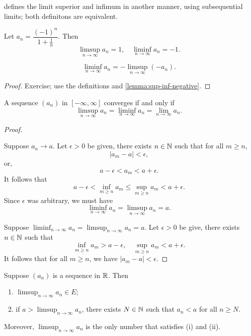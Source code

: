 \begin{remark}
\cite{rudin} defines the limit superior and infimum in another manner, using subsequential limits; both definitons are equivalent.
\end{remark}

\begin{example}
Let $a_n=\dfrac{(-1)^n}{1+\frac{1}{n}}$. Then
\[\limsup_{n\to\infty}a_n=1,\quad\liminf_{n\to\infty}a_n=-1.\]
\end{example}

\begin{lemma}
\[\liminf_{n\to\infty}a_n=-\limsup_{n\to\infty}(-a_n).\]
\end{lemma}

\begin{proof}
Exercise; use the definitions and \ref{lemma:sup-inf-negative}.
\end{proof}

\begin{lemma}
A sequence $(a_n)$ in $[-\infty,\infty]$ converges if and only if
\[\limsup_{n\to\infty}a_n=\liminf_{n\to\infty}a_n=\lim_{n\to\infty}a_n.\]
\end{lemma}

\begin{proof} \

\fbox{$\implies$} Suppose $a_n\to a$. Let $\epsilon>0$ be given, there exists $n\in\mathbb N$ such that for all $m\ge n$,
\[|a_m-a|<\epsilon,\]
or,
\[a-\epsilon<a_m<a+\epsilon.\]
It follows that
\[a-\epsilon<\inf_{m\ge n}a_m\le\sup_{m\ge n}a_m<a+\epsilon.\]
Since $\epsilon$ was arbitrary, we must have
\[\liminf_{n\to\infty}a_n=\limsup_{n\to\infty}a_n=a.\]

\fbox{$\impliedby$} Suppose $\displaystyle\liminf_{n\to\infty}a_n=\limsup_{n\to\infty}a_n=a$. Let $\epsilon>0$ be give, there exists $n\in\mathbb N$ such that
\[\inf_{m\ge n}a_m>a-\epsilon,\quad\sup_{m\ge n}a_m<a+\epsilon.\]
It follows that for all $m\ge n$, we have $|a_m-a|<\epsilon$.
\end{proof}

\begin{proposition}
Suppose $(a_n)$ is a sequence in $\mathbb R$. Then
\begin{enumerate}[label=(\roman*)]
\item $\displaystyle\limsup_{n\to\infty}a_n\in E$;
\item if $\displaystyle a>\limsup_{n\to\infty}a_n$, there exists $N\in\mathbb N$ such that $a_n<a$ for all $n\ge N$.
\end{enumerate}
Moreover, $\displaystyle\limsup_{n\to\infty}a_n$ is the only number that satisfies (i) and (ii).
\end{proposition}

